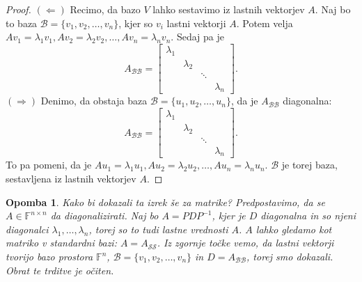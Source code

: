 \documentclass[10pt, a4paper]{article}
\newtheorem*{opomba}{Opomba}
\newenvironment{noticeC}{%
  \tcolorbox[%
  notitle,
  empty,
  enhanced,  %
  breakable,
  coltext=black, 
  fontupper=\rmfamily,
  parbox=false,
  noparskip,
  sharp corners,
  boxrule=-1pt,  %
  frame hidden,
  left=7pt,  %
  right=7pt,
  top=5pt,
  bottom=5pt,
  before skip=2.5ex plus 2pt,
  after skip=2.5ex plus 2pt,
  overlay unbroken and last={%
  },
  ]}
{\endtcolorbox}
\newenvironment{dokaz}%
  {\begin{noticeC}\begin{proof}}%
  {\end{proof}\end{noticeC}}
\newcommand{\F}{\mathbb {F}}
\begin{document}
\begin{dokaz}
    $(\Leftarrow)$ Recimo, da bazo $V$ lahko sestavimo iz lastnih vektorjev $A$. 
    Naj bo to baza $\mathcal{B} = \{v_1, v_2, \dots, v_n\}$, kjer so $v_i$ lastni vektorji $A$.
    Potem velja $A v_1 = \lambda_1 v_1, A v_2 = \lambda_2 v_2, \dots, A v_n = \lambda_n v_n$.
    Sedaj pa je $$A_\mathcal{BB} = \begin{bmatrix}
        \lambda_1 & & &\\
         & \lambda_2 & & \\
         & & \ddots & \\
         & & & \lambda_n
    \end{bmatrix}.$$
    $(\Rightarrow)$ Denimo, da obstaja baza $\mathcal{B} = \{u_1, u_2, \dots, u_n\}$, da je $A_\mathcal{BB}$ diagonalna:
    $$A_\mathcal{BB} = \begin{bmatrix}
        \lambda_1 & & &\\
         & \lambda_2 & & \\
         & & \ddots & \\
         & & & \lambda_n
    \end{bmatrix}.$$
    To pa pomeni, da je $A u_1 = \lambda_1 u_1, A u_2 = \lambda_2 u_2, \dots, A u_n = \lambda_n u_n$.
    $\mathcal{B}$ je torej baza, sestavljena iz lastnih vektorjev $A$.
\end{dokaz}

\begin{opomba}
    Kako bi dokazali ta izrek še za matrike? Predpostavimo, da se $A \in \F^{n \times n}$ da diagonalizirati.
    Naj bo $A = PDP^{-1}$, kjer je $D$ diagonalna in so njeni diagonalci $\lambda_1, \dots, \lambda_n$, torej so to tudi lastne vrednosti $A$.
    $A$ lahko gledamo kot matriko v standardni bazi: $A = A_\mathcal{SS}$.
    Iz zgornje točke vemo, da lastni vektorji tvorijo bazo prostora $\F^n$, $\mathcal{B} = \{v_1, v_2, \dots, v_n\}$ in $D = A_\mathcal{BB}$, torej smo dokazali.
    Obrat te trditve je očiten.
\end{opomba}
\end{document}
